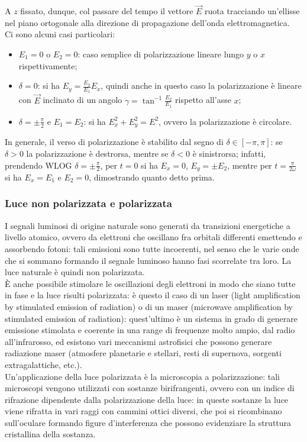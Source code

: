 \documentclass[]{article}
\begin{document}
A $ z $ fissato, dunque, col passare del tempo il vettore $ \vec{E} $ ruota tracciando un'ellisse nel piano ortogonale alla direzione di propagazione dell'onda elettromagnetica. \\ 
%
Ci sono alcuni casi particolari:
\begin{itemize}
	\item $ E_1 = 0 $ o $ E_2 = 0 $: caso semplice di polarizzazione lineare lungo $ y $ o $ x $ rispettivamente;
	\item $ \delta = 0 $: si ha $ E_y = \frac{E_2}{E_1} E_x $, quindi anche in questo caso la polarizzazione è lineare con $ \vec{E} $ inclinato di un angolo $ \gamma = \tan^{-1} \frac{E_2}{E_1} $ rispetto all'asse $ x $;
	\item $ \delta = \pm \frac{\pi}{2} $ e $ E_1 = E_2 $: si ha $ E_x^2 + E_y^2 = E^2 $, ovvero la polarizzazione è circolare. 
\end{itemize}
In generale, il verso di polarizzazione è stabilito dal segno di $ \delta \in [-\pi,\pi] $: se $ \delta > 0 $ la polarizzazione è destrorsa, mentre se $ \delta < 0 $ è sinistrorsa; infatti, prendendo WLOG $ \delta = \pm \frac{\pi}{2} $, per $ t = 0 $ si ha $ E_x = 0 $, $ E_y = \pm E_2 $, mentre per $ t = \frac{\pi}{2\omega} $ si ha $ E_x = E_1 $ e $ E_2 = 0 $, dimostrando quanto detto prima.

\subsubsection{Luce non polarizzata e polarizzata}

I segnali luminosi di origine naturale sono generati da transizioni energetiche a livello atomico, ovvero da elettroni che oscillano fra orbitali differenti emettendo e assorbendo fotoni: tali emissioni sono tutte incoerenti, nel senso che le varie onde che si sommano formando il segnale luminoso hanno fasi scorrelate tra loro. La luce naturale è quindi non polarizzata. \\ 
%
È anche possibile stimolare le oscillazioni degli elettroni in modo che siano tutte in fase e la luce risulti polarizzata: è questo il caso di un laser (light amplification by stimulated emission of radiation) o di un maser (microwave amplification by stimulated emission of radiation): quest'ultimo è un sistema in grado di generare emissione stimolata e coerente in una range di frequenze molto ampio, dal radio all'infrarosso, ed esistono vari meccanismi astrofisici che possono generare radiazione maser (atmosfere planetarie e stellari, resti di supernova, sorgenti extragalattiche, etc.). \\ 
%
Un'applicazione della luce polarizzata è la microscopia a polarizzazione: tali microscopi vengono utilizzati con sostanze birifrangenti, ovvero con un indice di rifrazione dipendente dalla polarizzazione della luce: in queste sostanze la luce viene rifratta in vari raggi con cammini ottici diversi, che poi si ricombinano sull'oculare formando figure d'interferenza che possono evidenziare la struttura cristallina della sostanza.
\end{document}
